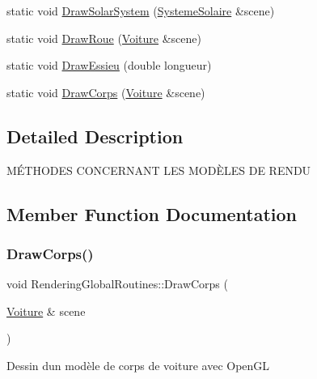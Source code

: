 \begin{DoxyCompactItemize}
static void \mbox{\hyperlink{structRenderingGlobalRoutines_a66996f7d19dd141a86439768657acb61}{Draw\+Solar\+System}} (\mbox{\hyperlink{classSystemeSolaire}{Systeme\+Solaire}} \&scene)
\item 
static void \mbox{\hyperlink{structRenderingGlobalRoutines_af7a121c7b024c10c68ca70946a17af77}{Draw\+Roue}} (\mbox{\hyperlink{classVoiture}{Voiture}} \&scene)
\item 
static void \mbox{\hyperlink{structRenderingGlobalRoutines_a429d26c5576b3b94bd77ad9bd3f00793}{Draw\+Essieu}} (double longueur)
\item 
static void \mbox{\hyperlink{structRenderingGlobalRoutines_a0b3445581f9e91e72c9a6c013e066ddd}{Draw\+Corps}} (\mbox{\hyperlink{classVoiture}{Voiture}} \&scene)
\end{DoxyCompactItemize}


\subsection{Detailed Description}
MÉ\+T\+H\+O\+D\+ES C\+O\+N\+C\+E\+R\+N\+A\+NT L\+ES M\+O\+DÈ\+L\+ES DE R\+E\+N\+DU 

\subsection{Member Function Documentation}
\mbox{\label{structRenderingGlobalRoutines_a0b3445581f9e91e72c9a6c013e066ddd}} 
\subsubsection{\texorpdfstring{DrawCorps()}{DrawCorps()}}
{\footnotesize\ttfamily void Rendering\+Global\+Routines\+::\+Draw\+Corps (\begin{DoxyParamCaption}\item[{\mbox{\hyperlink{classVoiture}{Voiture}} \&}]{scene }\end{DoxyParamCaption})\hspace{0.3cm}{\ttfamily [static]}}

Dessin d\textquotesingle{}un modèle de corps de voiture avec Open\+GL \mbox{\label{structRenderingGlobalRoutines_a429d26c5576b3b94bd77ad9bd3f00793}} 
